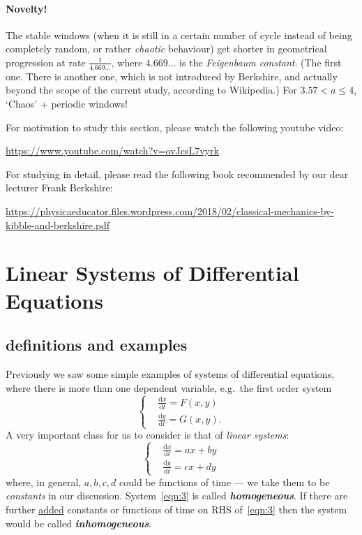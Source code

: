 \documentclass[12pt]{report}
\theoremstyle{definition}
\begin{document}
\paragraph{Novelty!}
The stable windows (when it is still in a certain number of cycle instead of
being completely random, or rather \emph{chaotic} behaviour) get shorter in geometrical progression
at rate $\frac{1}{4.669\ldots}$, where $4.669\ldots$ is the \emph{Feigenbaum constant}.
(The first one. There is another one, which is not introduced by Berkshire, and 
actually beyond the scope of the current study, according to Wikipedia.)
For $3.57 < a \le 4$, `Chaos' + periodic windows!

\bigskip
For motivation to study this section, please watch the following youtube video:

\ul{https://www.youtube.com/watch?v=ovJcsL7vyrk}

\bigskip
For studying in detail, please read the following book recommended by our dear lecturer Frank Berkshire:

\ul{https://physicaeducator.files.wordpress.com/2018/02/classical-mechanics-by-kibble-and-berkshire.pdf}



\section{Linear Systems of Differential Equations}

\subsection{definitions and examples}

Previously we saw some simple examples of systems of differential equations,
where there is more than one dependent variable, e.g.\ the first order system
\begin{equation}\label{eqn:4}
    \left\{\begin{align*}
        & \frac{\mathrm{d}x}{\mathrm{d}t} = F(x,y) \\
        & \frac{\mathrm{d}y}{\mathrm{d}t} = G(x,y).
    \end{align*}\right.
\end{equation}
A very important class for us to consider is that of \emph{linear systems}:
\begin{equation}\label{eqn:3}
    \left\{\begin{align*}
        & \frac{\mathrm{d}x}{\mathrm{d}t} = ax + by \\
        & \frac{\mathrm{d}y}{\mathrm{d}t} = cx + dy
    \end{align*}\right.
\end{equation}
where, in general, $a, b, c, d$ could be functions of time ---
we take them to be \emph{constants} in our discussion.
System~\eqref{eqn:3} is called \textbf{\emph{homogeneous}}.
If there are further \underline{added} constants or functions of time
on RHS of~\eqref{eqn:3} then the system would be called \textbf{\emph{inhomogeneous}}.
\end{document}
